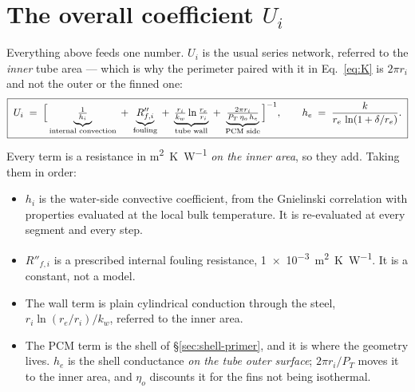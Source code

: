 \documentclass[11pt,a4paper]{article}
\newcommand{\Ui}{\ensuremath{U_{i}}}
\begin{document}
\section{The overall coefficient \texorpdfstring{$\Ui$}{Ui}}
\label{sec:Ui}

Everything above feeds one number. $\Ui$ is the usual series network, referred
to the \emph{inner} tube area --- which is why the perimeter paired with it in
Eq.~\eqref{eq:K} is $2\pi r_i$ and not the outer or the finned one:
\begin{equation}
  \boxed{\;
  \Ui \;=\;
  \Bigl[\,
    \underbrace{\tfrac{1}{h_i}}_{\text{internal convection}}
    \;+\;\underbrace{R''_{f,i}}_{\text{fouling}}
    \;+\;\underbrace{\tfrac{r_i}{k_w}\ln\tfrac{r_e}{r_i}}_{\text{tube wall}}
    \;+\;\underbrace{\tfrac{2\pi r_i}{P_T\,\eta_o\,h_e}}_{\text{PCM side}}
  \,\Bigr]^{-1},
  \qquad
  h_e \;=\; \frac{k}{r_e\,\ln\!\left(1+\delta/r_e\right)} .
  \;}
  \label{eq:Ui}
\end{equation}
Every term is a resistance in \si{\meter\squared\kelvin\per\watt} \emph{on the
inner area}, so they add. Taking them in order:

\begin{itemize}
\item $h_i$ is the water-side convective coefficient, from the Gnielinski
  correlation with properties evaluated at the local bulk temperature. It is
  re-evaluated at every segment and every step.
\item $R''_{f,i}$ is a prescribed internal fouling resistance,
  \SI{1e-3}{\meter\squared\kelvin\per\watt}. It is a constant, not a model.
\item The wall term is plain cylindrical conduction through the steel,
  $r_i \ln(r_e/r_i)/k_w$, referred to the inner area.
\item The PCM term is the shell of \S\ref{sec:shell-primer}, and it is where the
  geometry lives. $h_e$ is the shell conductance \emph{on the tube outer
  surface}; $2\pi r_i/P_T$ moves it to the inner area, and $\eta_o$ discounts it
  for the fins not being isothermal.
\end{itemize}
\end{document}

